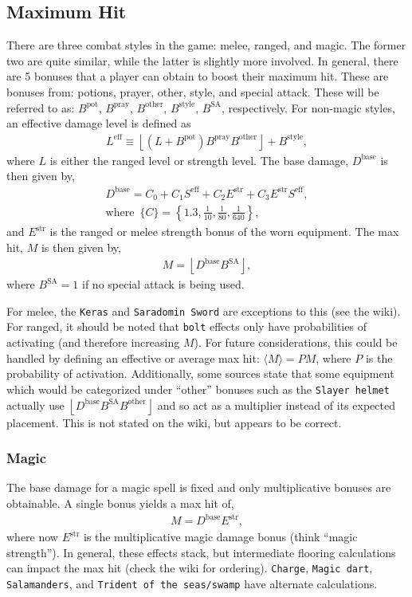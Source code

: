 \documentclass[../../main.tex]{subfiles}
\begin{document}
		\subsection{Maximum Hit}
			There are three combat styles in the game: melee, ranged, and magic. The former two are quite similar, while the latter is slightly more involved. In general, there are 5 bonuses that a player can obtain to boost their maximum hit. These are bonuses from: potions, prayer, other, style, and special attack. These will be referred to as: $B^\text{pot}$, $B^\text{pray}$, $B^\text{other}$, $B^\text{style}$, $B^\text{SA}$, respectively. For non-magic styles, an effective damage level is defined as
			\begin{align}
				L^\text{eff} \equiv \left \lfloor \left(L + B^\text{pot} \right)B^\text{pray}B^\text{other} \right \rfloor + B^\text{style},
			\end{align}
			where $L$ is either the ranged level or strength level. The base damage, $D^\text{base}$ is then given by,
			\begin{align}
				D^\text{base} = C_0 + C_1S^\text{eff} + C_2 E^\text{str} + C_3 E^\text{str}S^\text{eff},\\
				\text{where}\,\,\, \{C\} = \left\{1.3, \frac{1}{10}, \frac{1}{80}, \frac{1}{640}\right\},
			\end{align}
			and $E^\text{str}$ is the ranged or melee strength bonus of the worn equipment. The max hit, $M$ is then given by,
			\begin{align}
				\boxed{M = \left \lfloor D^\text{base} B^\text{SA}\right \rfloor,}
			\end{align}
			where $B^\text{SA} = 1$ if no special attack is being used.

 			For melee, the \texttt{Keras} and \texttt{Saradomin Sword} are exceptions to this (see the wiki). For ranged, it should be noted that \texttt{bolt} effects only have probabilities of activating (and therefore increasing $M$). For future considerations, this could be handled by defining an effective or average max hit: $\langle M \rangle = P M$, where $P$ is the probability of activation. Additionally, some sources state that some equipment which would be categorized under ``other'' bonuses such as the \texttt{Slayer helmet} actually use $\left \lfloor D^\text{base} B^\text{SA}B^\text{other}\right \rfloor$ and so act as a multiplier instead of its expected placement. This is not stated on the wiki, but appears to be correct.
			\subsubsection{Magic}
				The base damage for a magic spell is fixed and only multiplicative bonuses are obtainable. A single bonus yields a max hit of,
				\begin{align}
					M = D^\text{base}E^\text{str},
				\end{align}
				where now $E^\text{str}$ is the multiplicative magic damage bonus (think ``magic strength''). In general, these effects stack, but intermediate flooring calculations can impact the max hit (check the wiki for ordering). \texttt{Charge}, \texttt{Magic dart}, \texttt{Salamanders}, and \texttt{Trident of the seas/swamp} have alternate calculations.
\end{document}
